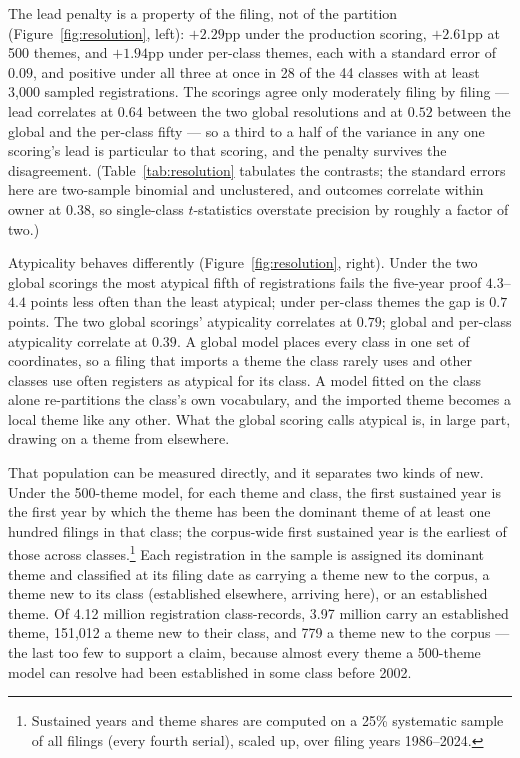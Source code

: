 The lead penalty is a property of the filing, not of the partition
(Figure~\ref{fig:resolution}, left): $+2.29$pp under the production
scoring, $+2.61$pp at 500 themes, and $+1.94$pp under per-class themes,
each with a standard error of $0.09$, and positive under all three at once
in 28 of the 44 classes with at least 3{,}000 sampled registrations. The
scorings agree only moderately filing by filing --- lead correlates at
$0.64$ between the two global resolutions and at $0.52$ between the global
and the per-class fifty --- so a third to a half of the variance in any
one scoring's lead is particular to that scoring, and the penalty survives
the disagreement. (Table~\ref{tab:resolution} tabulates the contrasts; the
standard errors here are two-sample binomial and unclustered, and
outcomes correlate within owner at $0.38$, so single-class $t$-statistics
overstate precision by roughly a factor of two.)

\begin{table}[!htbp]\centering\small
\caption{Failure contrasts at the five-year proof under three theme
scorings, on the identical registrations. Top-minus-bottom quintile,
quintiles cut within Nice class and registration year, no controls;
$n = 3{,}105{,}048$, base failure 52.3\%.}
\label{tab:resolution}

\end{table}

Atypicality behaves differently (Figure~\ref{fig:resolution}, right).
Under the two global scorings the most atypical fifth of registrations
fails the five-year proof $4.3$--$4.4$ points less often than the least
atypical; under per-class themes the gap is $0.7$ points. The two global
scorings' atypicality correlates at $0.79$; global and per-class
atypicality correlate at $0.39$. A global model places every class in one
set of coordinates, so a filing that imports a theme the class rarely uses
and other classes use often registers as atypical for its class. A model
fitted on the class alone re-partitions the class's own vocabulary, and
the imported theme becomes a local theme like any other. What the global
scoring calls atypical is, in large part, drawing on a theme from
elsewhere.

That population can be measured directly, and it separates two kinds of
new. Under the 500-theme model, for each theme and class, the first
sustained year is the first year by which the theme has been the dominant
theme of at least one hundred filings in that class; the corpus-wide first
sustained year is the earliest of those across classes.\footnote{Sustained
years and theme shares are computed on a 25\% systematic sample of all
filings (every fourth serial), scaled up, over filing years 1986--2024.}
Each registration in the sample is assigned its dominant theme and
classified at its filing date as carrying a theme new to the corpus, a
theme new to its class (established elsewhere, arriving here), or an
established theme. Of 4.12 million registration class-records, 3.97
million carry an established theme, 151{,}012 a theme new to their class,
and 779 a theme new to the corpus --- the last too few to support a
claim, because almost every theme a 500-theme model can resolve had been
established in some class before 2002.

